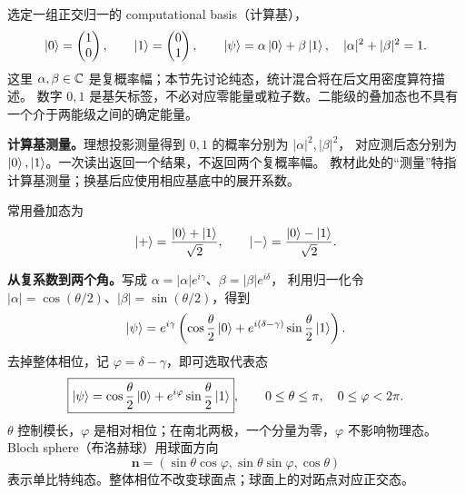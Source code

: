 选定一组正交归一的 computational basis（计算基），
\begin{equation*}
  \left|0\right\rangle=\begin{pmatrix}1\\0\end{pmatrix},\qquad
  \left|1\right\rangle=\begin{pmatrix}0\\1\end{pmatrix},\qquad
  \left|\psi\right\rangle=\alpha\left|0\right\rangle+\beta\left|1\right\rangle,\quad
  |\alpha|^2+|\beta|^2=1.
\end{equation*}
这里 $\alpha,\beta\in\mathbb{C}$ 是复概率幅；本节先讨论纯态，统计混合将在后文用密度算符描述。
数字 $0,1$ 是基矢标签，不必对应零能量或粒子数。二能级的叠加态也不具有一个介于两能级之间的确定能量。

\textbf{计算基测量。}理想投影测量得到 $0,1$ 的概率分别为 $|\alpha|^2,|\beta|^2$，
对应测后态分别为 $\left|0\right\rangle,\left|1\right\rangle$。一次读出返回一个结果，不返回两个复概率幅。
教材此处的“测量”特指计算基测量；换基后应使用相应基底中的展开系数。

常用叠加态为
\begin{equation*}
  \left|+\right\rangle=\frac{\left|0\right\rangle+\left|1\right\rangle}{\sqrt2},\qquad
  \left|-\right\rangle=\frac{\left|0\right\rangle-\left|1\right\rangle}{\sqrt2}.
\end{equation*}

\textbf{从复系数到两个角。}写成 $\alpha=|\alpha|e^{i\gamma}$、$\beta=|\beta|e^{i\delta}$，
利用归一化令 $|\alpha|=\cos(\theta/2)$、$|\beta|=\sin(\theta/2)$，得到
\begin{equation*}
  \left|\psi\right\rangle=e^{i\gamma}\left(\cos\frac\theta2\left|0\right\rangle+
  e^{i(\delta-\gamma)}\sin\frac\theta2\left|1\right\rangle\right).
\end{equation*}
去掉整体相位，记 $\varphi=\delta-\gamma$，即可选取代表态
\begin{equation*}
  \boxed{\left|\psi\right\rangle=\cos\frac\theta2\left|0\right\rangle+e^{i\varphi}\sin\frac\theta2\left|1\right\rangle},
  \qquad 0\le\theta\le\pi,\quad 0\le\varphi<2\pi.
\end{equation*}
$\theta$ 控制模长，$\varphi$ 是相对相位；在南北两极，一个分量为零，$\varphi$ 不影响物理态。
Bloch sphere（布洛赫球）用球面方向
\begin{equation*}
  \mathbf n=(\sin\theta\cos\varphi,\sin\theta\sin\varphi,\cos\theta)
\end{equation*}
表示单比特纯态。整体相位不改变球面点；球面上的对跖点对应正交态。

